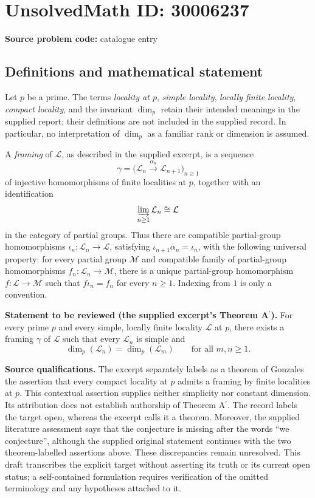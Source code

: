\documentclass[11pt]{article}
\begin{document}
\section*{UnsolvedMath ID: 30006237}
\textbf{Source problem code:} catalogue entry
\subsection{Definitions and mathematical statement}
Let \(p\) be a prime. The terms \emph{locality at \(p\)}, \emph{simple locality}, \emph{locally finite locality}, \emph{compact locality}, and the invariant \(\dim_p\) retain their intended meanings in the supplied report; their definitions are not included in the supplied record. In particular, no interpretation of \(\dim_p\) as a familiar rank or dimension is assumed.

A \emph{framing} of \(\mathcal L\), as described in the supplied excerpt, is a sequence
\[
\gamma=\bigl(\mathcal L_n\xrightarrow{\alpha_n}\mathcal L_{n+1}\bigr)_{n\geq 1}
\]
of injective homomorphisms of finite localities at \(p\), together with an identification
\[
\varinjlim_{n\geq 1}\mathcal L_n\cong\mathcal L
\]
in the category of partial groups. Thus there are compatible partial-group homomorphisms \(\iota_n:\mathcal L_n\to\mathcal L\), satisfying \(\iota_{n+1}\alpha_n=\iota_n\), with the following universal property: for every partial group \(\mathcal M\) and compatible family of partial-group homomorphisms \(f_n:\mathcal L_n\to\mathcal M\), there is a unique partial-group homomorphism \(f:\mathcal L\to\mathcal M\) such that \(f\iota_n=f_n\) for every \(n\geq1\). Indexing from \(1\) is only a convention.

\textbf{Statement to be reviewed (the supplied excerpt's Theorem A\(^{\prime}\)).} For every prime \(p\) and every simple, locally finite locality \(\mathcal L\) at \(p\), there exists a framing \(\gamma\) of \(\mathcal L\) such that every \(\mathcal L_n\) is simple and
\[
\dim_p(\mathcal L_n)=\dim_p(\mathcal L_m)
\qquad\text{for all }m,n\geq1.
\]

\textbf{Source qualifications.} The excerpt separately labels as a theorem of Gonzales the assertion that every compact locality at \(p\) admits a framing by finite localities at \(p\). This contextual assertion supplies neither simplicity nor constant dimension. Its attribution does not establish authorship of Theorem A\(^{\prime}\). The record labels the target open, whereas the excerpt calls it a theorem. Moreover, the supplied literature assessment says that the conjecture is missing after the words ``we conjecture'', although the supplied original statement continues with the two theorem-labelled assertions above. These discrepancies remain unresolved. This draft transcribes the explicit target without asserting its truth or its current open status; a self-contained formulation requires verification of the omitted terminology and any hypotheses attached to it.
\end{document}
